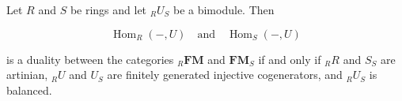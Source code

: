 Let $R$ and $S$ be rings and let ${}_R U_S$ be a bimodule. Then

$$\operatorname{Hom}_R(-, U) \quad \text{and} \quad \operatorname{Hom}_S(-, U)$$

is a duality between the categories ${}_R \mathbf{FM}$ and $\mathbf{FM}_S$ if and only if ${}_R R$ and $S_S$ are artinian, ${}_R U$ and $U_S$ are finitely generated injective cogenerators, and ${}_R U_S$ is balanced.

